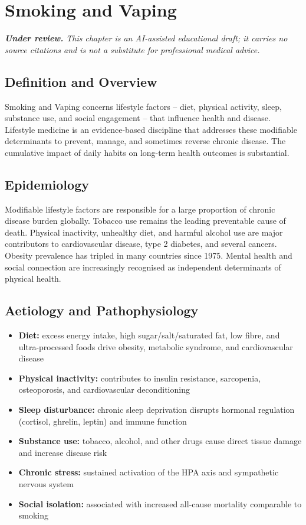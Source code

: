 \chapter{Smoking and Vaping}

\medskip
\noindent\textit{\textbf{Under review.} This chapter is an AI-assisted educational draft; it carries no source citations and is not a substitute for professional medical advice.}

\section*{Definition and Overview}
Smoking and Vaping concerns lifestyle factors -- diet, physical activity, sleep, substance use, and social engagement -- that influence health and disease. Lifestyle medicine is an evidence-based discipline that addresses these modifiable determinants to prevent, manage, and sometimes reverse chronic disease. The cumulative impact of daily habits on long-term health outcomes is substantial.

\section*{Epidemiology}
Modifiable lifestyle factors are responsible for a large proportion of chronic disease burden globally. Tobacco use remains the leading preventable cause of death. Physical inactivity, unhealthy diet, and harmful alcohol use are major contributors to cardiovascular disease, type 2 diabetes, and several cancers. Obesity prevalence has tripled in many countries since 1975. Mental health and social connection are increasingly recognised as independent determinants of physical health.

\section*{Aetiology and Pathophysiology}
\begin{itemize}
    \item \textbf{Diet:} excess energy intake, high sugar/salt/saturated fat, low fibre, and ultra-processed foods drive obesity, metabolic syndrome, and cardiovascular disease
    \item \textbf{Physical inactivity:} contributes to insulin resistance, sarcopenia, osteoporosis, and cardiovascular deconditioning
    \item \textbf{Sleep disturbance:} chronic sleep deprivation disrupts hormonal regulation (cortisol, ghrelin, leptin) and immune function
    \item \textbf{Substance use:} tobacco, alcohol, and other drugs cause direct tissue damage and increase disease risk
    \item \textbf{Chronic stress:} sustained activation of the HPA axis and sympathetic nervous system
    \item \textbf{Social isolation:} associated with increased all-cause mortality comparable to smoking
\end{itemize}


